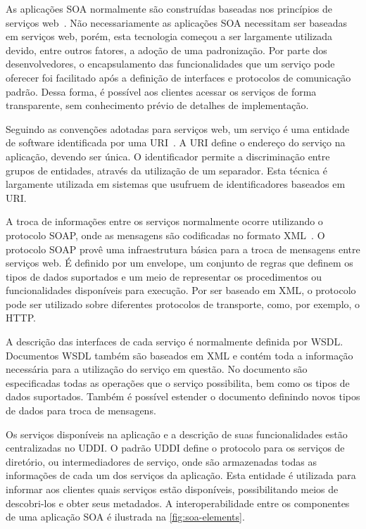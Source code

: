 As aplicações \gls{SOA} normalmente são construídas baseadas nos princípios de serviços
web~\cite{josuttis2009soa}. Não necessariamente as aplicações \gls{SOA} necessitam ser baseadas em
serviços web, porém, esta tecnologia começou a ser largamente utilizada devido, entre outros
fatores, a adoção de uma padronização. Por parte dos desenvolvedores, o encapsulamento das
funcionalidades que um serviço pode oferecer foi facilitado após a definição de interfaces e
protocolos de comunicação padrão. Dessa forma, é possível aos clientes acessar os serviços de forma
transparente, sem conhecimento prévio de detalhes de implementação.

Seguindo as convenções adotadas para serviços web, um serviço é uma entidade de software
identificada por uma \gls{URI}~\cite{bell2008service}. A \gls{URI} define o endereço do serviço na
aplicação, devendo ser única. O identificador permite a discriminação entre grupos de entidades,
através da utilização de um separador. Esta técnica é largamente utilizada em sistemas que usufruem
de identificadores baseados em \gls{URI}.

A troca de informações entre os serviços normalmente ocorre utilizando o protocolo \gls{SOAP}, onde
as mensagens são codificadas no formato \gls{XML}~\cite{josuttis2009soa}. O protocolo \gls{SOAP}
provê uma infraestrutura básica para a troca de mensagens entre serviços web. É definido por um
envelope, um conjunto de regras que definem os tipos de dados suportados e um meio de representar os
procedimentos ou funcionalidades disponíveis para execução. Por ser baseado em \gls{XML}, o
protocolo pode ser utilizado sobre diferentes protocolos de transporte, como, por exemplo, o
\gls{HTTP}.

A descrição das interfaces de cada serviço é normalmente definida por \gls{WSDL}. Documentos
\gls{WSDL} também são baseados em \gls{XML} e contém toda a informação necessária para a utilização
do serviço em questão. No documento são especificadas todas as operações que o serviço possibilita,
bem como os tipos de dados suportados. Também é possível estender o documento definindo novos tipos
de dados para troca de mensagens.

Os serviços disponíveis na aplicação e a descrição de suas funcionalidades estão centralizadas no
\gls{UDDI}. O padrão \gls{UDDI} define o protocolo para os serviços de diretório, ou intermediadores
de serviço, onde são armazenadas todas as informações de cada um dos serviços da aplicação. Esta
entidade é utilizada para informar aos clientes quais serviços estão disponíveis, possibilitando
meios de descobri-los e obter seus metadados. A interoperabilidade entre os componentes de uma
aplicação \gls{SOA} é ilustrada na \cref{fig:soa-elements}.

